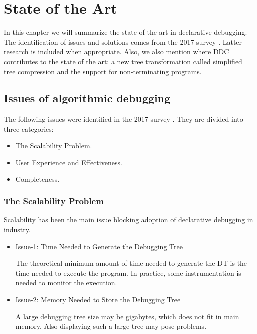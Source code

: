 \chapter{State of the Art}
\label{cap:estadoDeLaCuestion}

In this chapter we will summarize the state of the art in declarative debugging.
%
The identification of issues and solutions comes from the 2017 survey \cite{Survey}. Latter research is included when appropriate. Also, we also mention where DDC contributes to the state of the art: a new tree transformation called simplified tree compression and the support for non-terminating programs.

\section{Issues of algorithmic debugging}
The following issues were identified in the 2017 survey \cite{Survey}. They are divided into three categories:
\begin{itemize}
    \item The Scalability Problem.
    \item User Experience and Effectiveness.
    \item Completeness.
\end{itemize}
\subsection{The Scalability Problem}
Scalability has been the main issue blocking adoption of declarative debugging in industry.
\begin{itemize}
    \item Issue-1: Time Needed to Generate the Debugging Tree
    
The theoretical minimum amount of time needed to generate the DT is the time needed to execute the program. In practice, some instrumentation is needed to monitor the execution.
    \item Issue-2: Memory Needed to Store the Debugging Tree

A large debugging tree size may be gigabytes, which does not fit in main memory. Also displaying such a large tree may pose problems.
\end{itemize}
